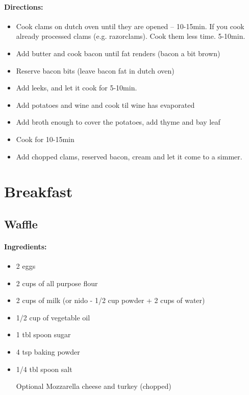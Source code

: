 \documentclass{article}
\begin{document}
\paragraph{Directions:}
\begin{itemize}
	\item Cook clams on dutch oven until they are opened -- 10-15min. If you cook already processed clams (e.g. razorclams). Cook them less time. 5-10min.
	\item Add butter and cook bacon until fat renders (bacon a bit brown)
	\item Reserve bacon bits (leave bacon fat in dutch oven)
	\item Add leeks, and let it cook for 5-10min.
	\item Add potatoes and wine and cook til wine has evaporated
	\item Add broth enough to cover the potatoes, add thyme and bay leaf
	\item Cook for 10-15min
	\item Add chopped clams, reserved bacon, cream and let it come to a simmer.
\end{itemize}

\section{Breakfast}

\subsection{Waffle}

\paragraph{Ingredients:}

\begin{itemize}
	\item 2 eggs
	\item 2 cups of all purpose flour
	\item 2 cups of milk (or nido - 1/2 cup powder + 2 cups of water)
	\item 1/2 cup of vegetable oil
	\item 1 tbl spoon sugar
	\item 4 tsp baking powder
	\item 1/4 tbl spoon salt
	\item [Optional] Mozzarella cheese and turkey (chopped)
\end{itemize}
\end{document}
